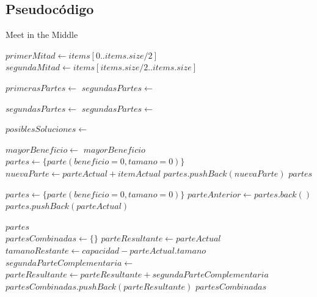 \documentclass[10pt, a4paper]{article}
\begin{document}
\subsection{Pseudocódigo}
\begin{algorithm}
\caption{Meet in the Middle}
\begin{algorithmic}[1]
	\State $primerMitad \gets items[0..items.size / 2]$
	\State $segundaMitad \gets items[items.size / 2..items.size]$

	\State $primerasPartes \gets $ 
	\State $segundasPartes \gets $ 

	\State $segundasPartes \gets $ 
	\State $segundasPartes \gets $ 

	\State $posiblesSoluciones \gets $ 

	\State $mayorBeneficio \gets $ 
	\State \Return $mayorBeneficio$
\EndFunction
\\
	\State $partes \gets \{parte(beneficio=0, tamano=0)\}$
			\State $nuevaParte \gets parteActual + itemActual$
				\State $partes.pushBack(nuevaParte)$
			\EndIf
		\EndFor
	\EndFor
	\State \Return $partes$
\EndFunction
\\

	\State $partes \gets \{parte(beneficio=0, tamano=0)\}$
		\State $parteAnterior \gets partes.back()$
			\State $partes.pushBack(parteActual)$
		\EndIf
	\EndFor

	\State \Return $partes$
\EndFunction
\\
	\State $partesCombinadas \gets \{\}$
		\State $parteResultante \gets parteActual$
		\State $tamanoRestante \gets capacidad - parteActual.tamano$
		\State $segundaParteComplementaria \gets$
			\State $parteResultante \gets parteResultante + segundaParteComplementaria$
		\EndIf
		\State $partesCombinadas.pushBack(parteResultante)$
	\EndFor
	\State \Return $partesCombinadas$
\EndFunction
\end{algorithmic}
\end{algorithm}
\pagebreak
\end{document}
